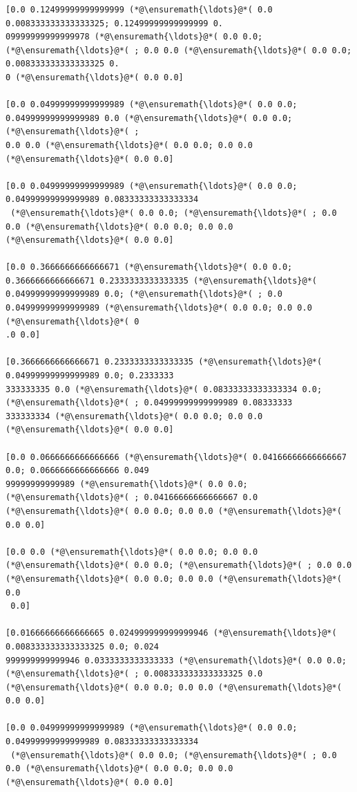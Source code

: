 \documentclass[12pt,a4paper]{article}
\begin{document}
\begin{lstlisting}
[0.0 0.12499999999999999 (*@\ensuremath{\ldots}@*( 0.0 0.008333333333333325; 0.12499999999999999 0.
09999999999999978 (*@\ensuremath{\ldots}@*( 0.0 0.0; (*@\ensuremath{\ldots}@*( ; 0.0 0.0 (*@\ensuremath{\ldots}@*( 0.0 0.0; 0.008333333333333325 0.
0 (*@\ensuremath{\ldots}@*( 0.0 0.0]

[0.0 0.04999999999999989 (*@\ensuremath{\ldots}@*( 0.0 0.0; 0.04999999999999989 0.0 (*@\ensuremath{\ldots}@*( 0.0 0.0; (*@\ensuremath{\ldots}@*( ; 
0.0 0.0 (*@\ensuremath{\ldots}@*( 0.0 0.0; 0.0 0.0 (*@\ensuremath{\ldots}@*( 0.0 0.0]

[0.0 0.04999999999999989 (*@\ensuremath{\ldots}@*( 0.0 0.0; 0.04999999999999989 0.08333333333333334
 (*@\ensuremath{\ldots}@*( 0.0 0.0; (*@\ensuremath{\ldots}@*( ; 0.0 0.0 (*@\ensuremath{\ldots}@*( 0.0 0.0; 0.0 0.0 (*@\ensuremath{\ldots}@*( 0.0 0.0]

[0.0 0.3666666666666671 (*@\ensuremath{\ldots}@*( 0.0 0.0; 0.3666666666666671 0.2333333333333335 (*@\ensuremath{\ldots}@*( 
0.04999999999999989 0.0; (*@\ensuremath{\ldots}@*( ; 0.0 0.04999999999999989 (*@\ensuremath{\ldots}@*( 0.0 0.0; 0.0 0.0 (*@\ensuremath{\ldots}@*( 0
.0 0.0]

[0.3666666666666671 0.2333333333333335 (*@\ensuremath{\ldots}@*( 0.04999999999999989 0.0; 0.2333333
333333335 0.0 (*@\ensuremath{\ldots}@*( 0.08333333333333334 0.0; (*@\ensuremath{\ldots}@*( ; 0.04999999999999989 0.08333333
333333334 (*@\ensuremath{\ldots}@*( 0.0 0.0; 0.0 0.0 (*@\ensuremath{\ldots}@*( 0.0 0.0]

[0.0 0.0666666666666666 (*@\ensuremath{\ldots}@*( 0.04166666666666667 0.0; 0.0666666666666666 0.049
99999999999989 (*@\ensuremath{\ldots}@*( 0.0 0.0; (*@\ensuremath{\ldots}@*( ; 0.04166666666666667 0.0 (*@\ensuremath{\ldots}@*( 0.0 0.0; 0.0 0.0 (*@\ensuremath{\ldots}@*( 
0.0 0.0]

[0.0 0.0 (*@\ensuremath{\ldots}@*( 0.0 0.0; 0.0 0.0 (*@\ensuremath{\ldots}@*( 0.0 0.0; (*@\ensuremath{\ldots}@*( ; 0.0 0.0 (*@\ensuremath{\ldots}@*( 0.0 0.0; 0.0 0.0 (*@\ensuremath{\ldots}@*( 0.0
 0.0]

[0.01666666666666665 0.024999999999999946 (*@\ensuremath{\ldots}@*( 0.008333333333333325 0.0; 0.024
999999999999946 0.0333333333333333 (*@\ensuremath{\ldots}@*( 0.0 0.0; (*@\ensuremath{\ldots}@*( ; 0.008333333333333325 0.0 
(*@\ensuremath{\ldots}@*( 0.0 0.0; 0.0 0.0 (*@\ensuremath{\ldots}@*( 0.0 0.0]

[0.0 0.04999999999999989 (*@\ensuremath{\ldots}@*( 0.0 0.0; 0.04999999999999989 0.08333333333333334
 (*@\ensuremath{\ldots}@*( 0.0 0.0; (*@\ensuremath{\ldots}@*( ; 0.0 0.0 (*@\ensuremath{\ldots}@*( 0.0 0.0; 0.0 0.0 (*@\ensuremath{\ldots}@*( 0.0 0.0]


\end{lstlisting}
\end{document}
